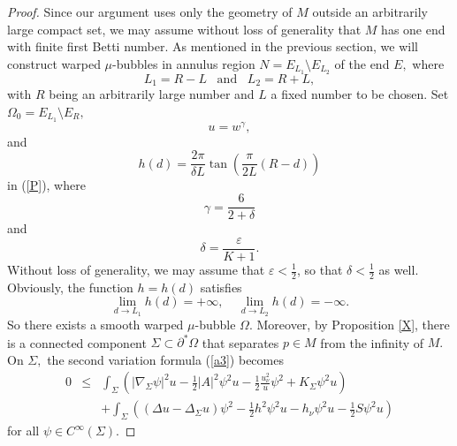 \documentclass{amsart}
\numberwithin{equation}{section}
\begin{document}
\begin{proof}
Since our argument uses only the geometry of $M$ outside an arbitrarily large compact
set, we may assume without loss of generality that $M$ has one end with
finite first Betti number.
As mentioned in the previous section, we will construct warped
$\mu$-bubbles in annulus region $N=E_{L_1}\setminus E_{L_2}$ of the end $E,$
where $$L_1=R-L \;\;\;\text{and}\;\;\; L_2=R+L,$$ with $R$ being an arbitrarily large number and $L$ a fixed number
to be chosen. Set $\Omega_0=E_{L_1}\setminus E_{R},$ $$u=w^{\gamma },$$ and 
\begin{equation*}
h\left( d\right) =\frac{2\pi }{\delta L}\tan \left( \frac{\pi }{2L}(R-d)\right)
\end{equation*} 
in (\ref{P}), where 
\begin{equation*}
\gamma =\frac{6}{2+\delta }
\end{equation*}
and 
\begin{equation*}
\delta =\frac{\varepsilon }{K+1}.
\end{equation*}
Without loss of generality, we may assume that $\varepsilon<\frac{1}{2}$, so  that $\delta <\frac{1}{2}$ as well. 
Obviously, the function $h=h\left( d\right) $ satisfies
\begin{equation*}
\lim_{d\rightarrow L_1}h\left( d\right) =+\infty ,\ \ \ \ \
\lim_{d\rightarrow L_2}h\left( d\right) =-\infty .  
\end{equation*}
So there exists a smooth warped $\mu$-bubble $\Omega.$ Moreover, by Proposition \ref{X},
there is a connected component $\Sigma \subset \partial ^{\ast }\Omega $
that separates $p\in M$ from the infinity of $M.$ On $\Sigma,$ the second variation formula (\ref{a3}) becomes
\begin{eqnarray*}
0 &\leq &\int_{\Sigma}\left( \left\vert \nabla _{\Sigma
}\psi \right\vert ^{2}u-\frac{1}{2}\left\vert A\right\vert ^{2}\psi ^{2}u-%
\frac{1}{2}\frac{u_{\nu }^{2}}{u}\psi ^{2}+K_{\Sigma}\psi
^{2}u\right) \\
&&+\int_{\Sigma }\left( \left( \Delta u-\Delta _{\Sigma}u\right) \psi ^{2}-\frac{1}{2}h^{2}\psi ^{2}u-h_{\nu }\psi
^{2}u-\frac{1}{2}S\psi ^{2}u\right)
\end{eqnarray*}%
for all $\psi \in C^{\infty }\left( \Sigma \right).$ 


\end{proof}
\end{document}
